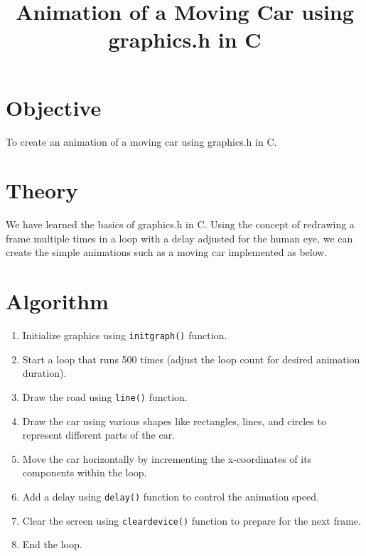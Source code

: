 \documentclass[12pt]{article}
\title{Animation of a Moving Car using graphics.h in C}
\date{}
\author{}
\begin{document}
	\maketitle
	\vspace{-2cm}

	\section{Objective}
	To create an animation of a moving car using graphics.h in C.
	\section{Theory}
	We have learned the basics of graphics.h in C. 
	Using the concept of redrawing a frame multiple times in a loop with a delay adjusted for the human eye, we can create the simple animations such as a moving car implemented as below.

    \section{Algorithm}
    \begin{enumerate}
        \item Initialize graphics using \texttt{initgraph()} function.
        \item Start a loop that runs 500 times (adjust the loop count for desired animation duration).
        \item Draw the road using \texttt{line()} function.
        \item Draw the car using various shapes like rectangles, lines, and circles to represent different parts of the car.
        \item Move the car horizontally by incrementing the x-coordinates of its components within the loop.
        \item Add a delay using \texttt{delay()} function to control the animation speed.
        \item Clear the screen using \texttt{cleardevice()} function to prepare for the next frame.
        \item End the loop.
    \end{enumerate}
\end{document}
